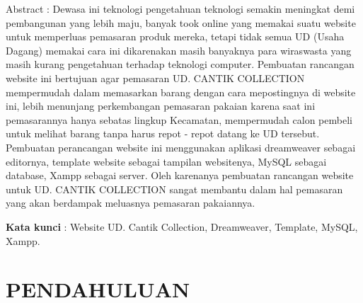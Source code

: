 \documentclass{jtetiproposalskripsi}
\begin{document}
\cover

\approvalpage


\begin{abstractind}
Abstract : Dewasa ini teknologi pengetahuan teknologi semakin meningkat demi pembangunan yang lebih maju, banyak took online yang memakai suatu website untuk memperluas pemasaran produk mereka, tetapi tidak semua UD (Usaha Dagang) memakai cara ini dikarenakan masih banyaknya para wiraswasta yang masih kurang pengetahuan terhadap teknologi computer. Pembuatan rancangan website ini bertujuan agar pemasaran UD. CANTIK COLLECTION mempermudah dalam memasarkan barang dengan cara mepostingnya di website ini, lebih menunjang perkembangan pemasaran pakaian karena saat ini pemasarannya hanya sebatas lingkup Kecamatan, mempermudah calon pembeli untuk melihat barang tanpa harus repot - repot datang ke UD tersebut. Pembuatan perancangan  website ini menggunakan aplikasi dreamweaver sebagai editornya, template website sebagai tampilan websitenya, MySQL sebagai database, Xampp sebagai server. Oleh karenanya pembuatan rancangan website untuk UD. CANTIK COLLECTION sangat membantu dalam hal pemasaran yang akan berdampak meluasnya pemasaran pakaiannya.

\bigskip
\textbf{Kata kunci} : Website UD. Cantik Collection, Dreamweaver, Template, MySQL, Xampp.
\end{abstractind}

\tableofcontents
{}
\clearpage{}\setcounter{page}{1}

\chapter{PENDAHULUAN}
\end{document}
